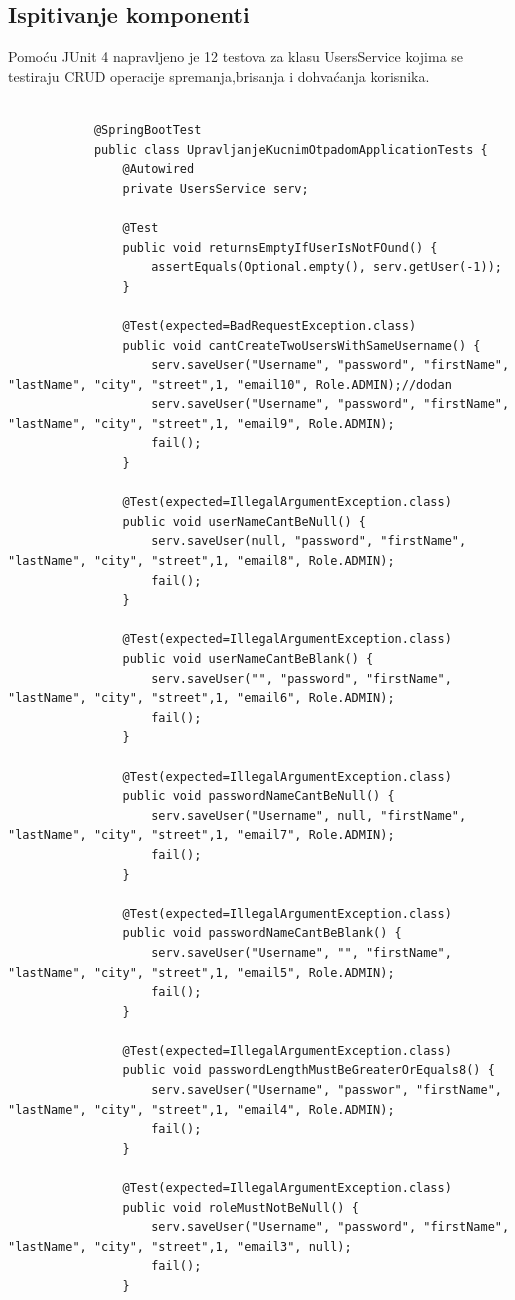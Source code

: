 			\subsection{Ispitivanje komponenti}
			Pomoću JUnit 4 napravljeno je 12 testova za klasu UsersService kojima se testiraju CRUD operacije spremanja,brisanja i dohvaćanja korisnika.
			\begin{lstlisting}
		
			@SpringBootTest
			public class UpravljanjeKucnimOtpadomApplicationTests {
				@Autowired
				private UsersService serv;
				
				@Test
				public void returnsEmptyIfUserIsNotFOund() {
					assertEquals(Optional.empty(), serv.getUser(-1));
				}
				
				@Test(expected=BadRequestException.class)
				public void cantCreateTwoUsersWithSameUsername() {
					serv.saveUser("Username", "password", "firstName", "lastName", "city", "street",1, "email10", Role.ADMIN);//dodan
					serv.saveUser("Username", "password", "firstName", "lastName", "city", "street",1, "email9", Role.ADMIN);
					fail();
				}
				
				@Test(expected=IllegalArgumentException.class)
				public void userNameCantBeNull() {
					serv.saveUser(null, "password", "firstName", "lastName", "city", "street",1, "email8", Role.ADMIN);
					fail();
				}
				
				@Test(expected=IllegalArgumentException.class)
				public void userNameCantBeBlank() {
					serv.saveUser("", "password", "firstName", "lastName", "city", "street",1, "email6", Role.ADMIN);
					fail();
				}
				
				@Test(expected=IllegalArgumentException.class)
				public void passwordNameCantBeNull() {
					serv.saveUser("Username", null, "firstName", "lastName", "city", "street",1, "email7", Role.ADMIN);
					fail();
				}
				
				@Test(expected=IllegalArgumentException.class)
				public void passwordNameCantBeBlank() {
					serv.saveUser("Username", "", "firstName", "lastName", "city", "street",1, "email5", Role.ADMIN);
					fail();
				}
				
				@Test(expected=IllegalArgumentException.class)
				public void passwordLengthMustBeGreaterOrEquals8() {
					serv.saveUser("Username", "passwor", "firstName", "lastName", "city", "street",1, "email4", Role.ADMIN);
					fail();
				}
				
				@Test(expected=IllegalArgumentException.class)
				public void roleMustNotBeNull() {
					serv.saveUser("Username", "password", "firstName", "lastName", "city", "street",1, "email3", null);
					fail();
				}
				

\end{lstlisting}

